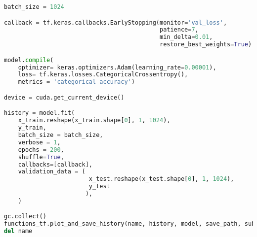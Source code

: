 \begin{lstlisting}[language=Python]
batch_size = 1024

callback = tf.keras.callbacks.EarlyStopping(monitor='val_loss', 
                                            patience=7, 
                                            min_delta=0.01,
                                            restore_best_weights=True)

model.compile(
    optimizer= keras.optimizers.Adam(learning_rate=0.00001),
    loss= tf.keras.losses.CategoricalCrossentropy(),
    metrics = 'categorical_accuracy')

device = cuda.get_current_device()

history = model.fit(
    x_train.reshape(x_train.shape[0], 1, 1024),
    y_train,
    batch_size = batch_size,
    verbose = 1,
    epochs = 200,
    shuffle=True,
    callbacks=[callback],
    validation_data = (
                        x_test.reshape(x_test.shape[0], 1, 1024),
                        y_test
                       ),
    )

gc.collect()
functions_tf.plot_and_save_history(name, history, model, save_path, subfolder=subfolder)
del name
\end{lstlisting}


